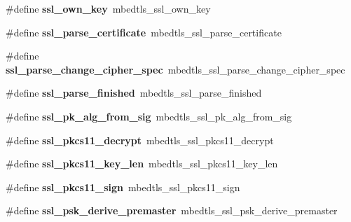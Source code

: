 \begin{DoxyCompactItemize}
\item 
\mbox{\label{compat-1_83_8h_abbaf94c0a47b1c7a6c77a95da30e72a0}} 
\#define {\bfseries ssl\+\_\+own\+\_\+key}~mbedtls\+\_\+ssl\+\_\+own\+\_\+key
\item 
\mbox{\label{compat-1_83_8h_afdb9480acfc37becc3a1084c042cca67}} 
\#define {\bfseries ssl\+\_\+parse\+\_\+certificate}~mbedtls\+\_\+ssl\+\_\+parse\+\_\+certificate
\item 
\mbox{\label{compat-1_83_8h_a6b2ce4ffcac487d16b83146a1d133762}} 
\#define {\bfseries ssl\+\_\+parse\+\_\+change\+\_\+cipher\+\_\+spec}~mbedtls\+\_\+ssl\+\_\+parse\+\_\+change\+\_\+cipher\+\_\+spec
\item 
\mbox{\label{compat-1_83_8h_a5eb43e8dcccd8004696ad83ecf61193e}} 
\#define {\bfseries ssl\+\_\+parse\+\_\+finished}~mbedtls\+\_\+ssl\+\_\+parse\+\_\+finished
\item 
\mbox{\label{compat-1_83_8h_a1e36b011310fa9b2e8752ca8c2dd953a}} 
\#define {\bfseries ssl\+\_\+pk\+\_\+alg\+\_\+from\+\_\+sig}~mbedtls\+\_\+ssl\+\_\+pk\+\_\+alg\+\_\+from\+\_\+sig
\item 
\mbox{\label{compat-1_83_8h_ac2e92daa9fe5ae832390236be3aaef2e}} 
\#define {\bfseries ssl\+\_\+pkcs11\+\_\+decrypt}~mbedtls\+\_\+ssl\+\_\+pkcs11\+\_\+decrypt
\item 
\mbox{\label{compat-1_83_8h_a48b04f4ea6bfa4121425f0bbf1ea2fd6}} 
\#define {\bfseries ssl\+\_\+pkcs11\+\_\+key\+\_\+len}~mbedtls\+\_\+ssl\+\_\+pkcs11\+\_\+key\+\_\+len
\item 
\mbox{\label{compat-1_83_8h_a1c6c845a38794a0e5331a84e033d32ef}} 
\#define {\bfseries ssl\+\_\+pkcs11\+\_\+sign}~mbedtls\+\_\+ssl\+\_\+pkcs11\+\_\+sign
\item 
\mbox{\label{compat-1_83_8h_a06e770536d6ef102492470f049f34ed5}} 
\#define {\bfseries ssl\+\_\+psk\+\_\+derive\+\_\+premaster}~mbedtls\+\_\+ssl\+\_\+psk\+\_\+derive\+\_\+premaster
\item 
\mbox{\label{compat-1_83_8h_a89c2cc5d78bdf46b8fbb5bde6d534240}} 

\end{DoxyCompactItemize}
